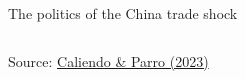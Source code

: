 \documentclass[notes,11pt, aspectratio=169, xcolor=table]{beamer}
\newenvironment{wideitemize}{\itemize\addtolength{\itemsep}{10pt}}{\enditemize}
\begin{document}
\begin{frame}{The politics of the China trade shock}

\begin{columns}[T] %
\begin{column}{.35\textwidth}
\centering
    \vspace{12pt}
    { \scriptsize
    Source: \href{https://www.annualreviews.org/content/journals/10.1146/annurev-economics-082222-082019}{Caliendo \& Parro (2023)}
    }
\end{column}%
\hfill%
\begin{column}{.65\textwidth}
{\small
\begin{wideitemize}


\end{wideitemize}}
\end{column}
\end{columns}
\end{frame}
\end{document}

